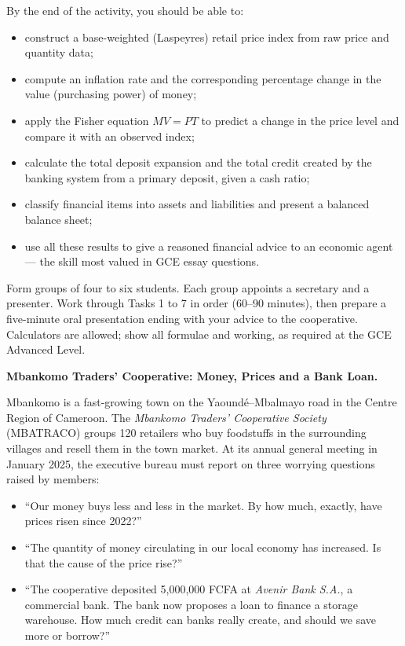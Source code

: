 \documentclass[11pt]{article}
\newcounter{popsec}
\newcounter{popsub}
\newcommand{\courssub}[1]{%
  \stepcounter{popsub}%
  \par\vspace{9pt}\noindent{\popxbold\fontsize{11.5}{13}\selectfont\color{popink}{\color{poporange}\thepopsec.\thepopsub}\hspace{6pt}#1}\par\nopagebreak\vspace{4pt}
}
\begin{document}
By the end of the activity, you should be able to:
\begin{itemize}
\item construct a base-weighted (Laspeyres) retail price index from raw price and quantity data;
\item compute an inflation rate and the corresponding percentage change in the value (purchasing power) of money;
\item apply the Fisher equation $MV = PT$ to predict a change in the price level and compare it with an observed index;
\item calculate the total deposit expansion and the total credit created by the banking system from a primary deposit, given a cash ratio;
\item classify financial items into assets and liabilities and present a balanced balance sheet;
\item use all these results to give a reasoned financial advice to an economic agent — the skill most valued in GCE essay questions.
\end{itemize}

\begin{methode}
Form groups of four to six students. Each group appoints a secretary and a presenter. Work through Tasks 1 to 7 in order (60--90 minutes), then prepare a five-minute oral presentation ending with your advice to the cooperative. Calculators are allowed; show all formulae and working, as required at the GCE Advanced Level.
\end{methode}

\courssub{Situation}

\textbf{Mbankomo Traders' Cooperative: Money, Prices and a Bank Loan.}\par
Mbankomo is a fast-growing town on the Yaound\'e--Mbalmayo road in the Centre Region of Cameroon. The \emph{Mbankomo Traders' Cooperative Society} (MBATRACO) groups 120 retailers who buy foodstuffs in the surrounding villages and resell them in the town market. At its annual general meeting in January 2025, the executive bureau must report on three worrying questions raised by members:
\begin{itemize}
\item ``Our money buys less and less in the market. By how much, exactly, have prices risen since 2022?''
\item ``The quantity of money circulating in our local economy has increased. Is that the cause of the price rise?''
\item ``The cooperative deposited 5,000,000 FCFA at \emph{Avenir Bank S.A.}, a commercial bank. The bank now proposes a loan to finance a storage warehouse. How much credit can banks really create, and should we save more or borrow?''
\end{itemize}
\end{document}
